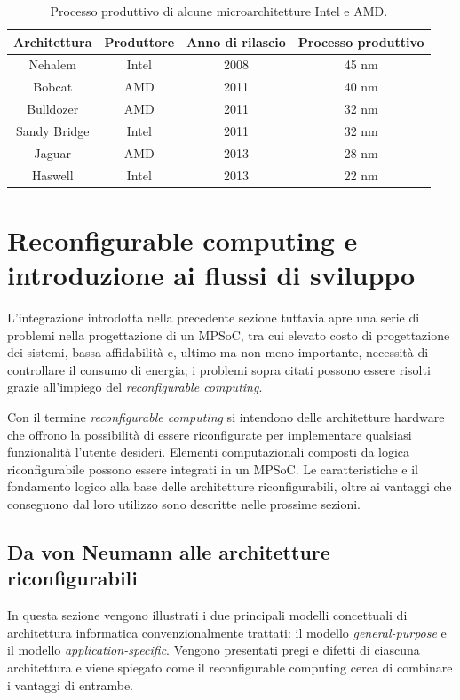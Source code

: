 \begin{table}[t]
  \begin{center}
    \begin{tabular}{|c|c|c|c|}
      \hline
      \textbf{Architettura} & \textbf{Produttore} & \textbf{Anno di rilascio} & \textbf{Processo produttivo}\\
      \hline
      Nehalem & Intel & 2008 & 45 nm\\
      \hline
      Bobcat & AMD & 2011 & 40 nm\\
      \hline
      Bulldozer & AMD & 2011 & 32 nm\\
      \hline
      Sandy Bridge & Intel & 2011 & 32 nm\\
      \hline
      Jaguar & AMD & 2013 & 28 nm\\
      \hline
      Haswell & Intel & 2013 & 22 nm\\
      \hline
    \end{tabular}
    \caption{Processo produttivo di alcune microarchitetture Intel
      \cite{IntelTransistor, IntelsVision} e AMD.}
    \label{tab:processoProduttivo}
  \end{center}
\end{table}



\section{Reconfigurable computing e introduzione ai flussi di sviluppo}
\label{sec:reconfComp}
L'integrazione introdotta nella precedente sezione tuttavia apre una serie di problemi nella progettazione
di un \ac{MPSoC}, tra cui elevato costo di progettazione dei sistemi, bassa affidabilità e, ultimo
ma non meno importante, necessità di controllare il consumo di energia; i problemi sopra citati possono
essere risolti grazie all'impiego del \emph{reconfigurable computing}.

Con il termine \emph{reconfigurable computing} si intendono delle architetture hardware che 
offrono la possibilità di essere riconfigurate per implementare qualsiasi funzionalità 
l'utente desideri. Elementi computazionali composti da logica riconfigurabile possono essere integrati in un
\ac{MPSoC}. Le caratteristiche e il fondamento logico alla base delle architetture riconfigurabili,
oltre ai vantaggi che conseguono dal loro utilizzo sono descritte nelle prossime sezioni.

\subsection{Da von Neumann alle architetture riconfigurabili}
\label{subsec:cambioParadigma}
In questa sezione vengono illustrati i due principali modelli concettuali di architettura
informatica convenzionalmente trattati: il modello \emph{general-purpose} e il modello
\emph{application-specific}. Vengono presentati pregi e difetti di ciascuna architettura
e viene spiegato come il reconfigurable computing cerca di combinare i vantaggi di
entrambe.

